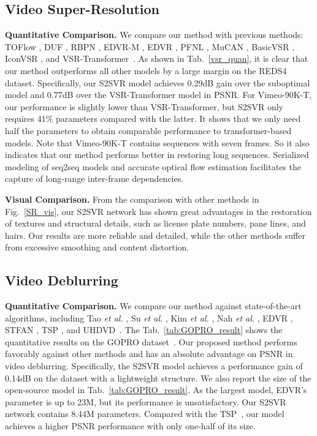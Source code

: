 \documentclass[nohyperref]{article}
\theoremstyle{plain}
\theoremstyle{definition}
\theoremstyle{remark}
\begin{document}
\subsection{Video Super-Resolution}
\vspace{-1mm}
\noindent\textbf{Quantitative Comparison.} We compare our method with previous methods: TOFlow \cite{r19}, DUF \cite{r75}, RBPN \cite{r76}, EDVR-M \cite{r11}, EDVR \cite{r11}, PFNL \cite{r77}, MuCAN \cite{r78}, BasicVSR \cite{r25}, IconVSR \cite{r25}, and VSR-Transformer~\cite{cao2021video}. As shown in Tab.~\ref{vsr_quan}, it is clear that our method outperforms all other models by a large margin on the REDS4 dataset. Specifically, our S2SVR model achieves 0.29dB gain over the suboptimal model and 0.77dB over the VSR-Transformer model in PSNR. For Vimeo-90K-T, our performance is slightly lower than VSR-Transformer, but S2SVR only requires 41\% parameters compared with the latter. It shows that we only need half the parameters to obtain comparable performance to transformer-based models. Note that Vimeo-90K-T contains sequences with seven frames. So it also indicates that our method performs better in restoring long sequences. Serialized modeling of seq2seq models and accurate optical flow estimation facilitates the capture of long-range inter-frame dependencies.


\noindent\textbf{Visual Comparison.} From the comparison with other methods in Fig.~\ref{SR_vis}, our S2SVR network has shown great advantages in the restoration of textures and structural details, such as license plate numbers, pane lines, and hairs. Our results are more reliable and detailed, while the other methods suffer from excessive smoothing and content distortion. 



\vspace{-3mm}
\subsection{Video Deblurring}
\vspace{-2mm}
\noindent\textbf{Quantitative Comparison.}
We compare our method against state-of-the-art algorithms, including Tao \textit{et al.} \cite{r67}, Su \textit{et al.} \cite{r68}, Kim \textit{et al.} \cite{r70}, Nah \textit{et al.} \cite{r71}, EDVR \cite{r11}, STFAN \cite{r72}, TSP \cite{r14}, and UHDVD~\cite{deng2021multi}. The Tab.~\ref{tab:GOPRO_result} shows the quantitative results on the GOPRO dataset~\cite{r74}. Our proposed method performs favorably against other methods and has an absolute advantage on PSNR in video deblurring. Specifically, the S2SVR model achieves a performance gain of 0.14dB on the dataset with a lightweight structure. We also report the size of the open-source model in Tab.~\ref{tab:GOPRO_result}. As the largest model, EDVR's parameter is up to 23M, but its performance is unsatisfactory. Our S2SVR network contains 8.44M parameters. Compared with the TSP~\cite{r14}, our model achieves a higher PSNR performance with only one-half of its size. 
\end{document}
